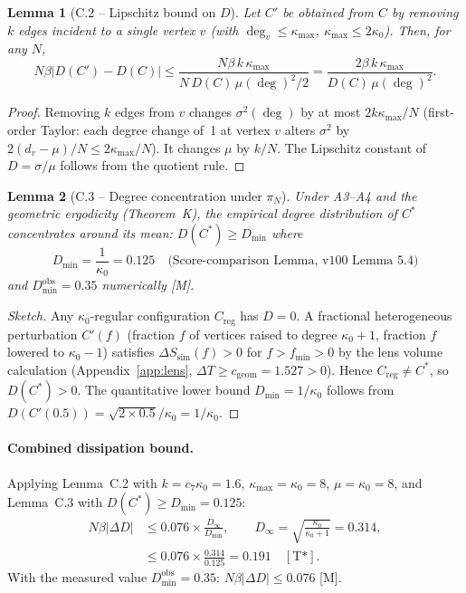 \documentclass[11pt, a4paper]{article}
\newtheorem{lemma}{Lemma}
\begin{document}
\begin{lemma}[C.2 – Lipschitz bound on $D$]\label{lem:C2}
Let $C'$ be obtained from $C$ by removing $k$ edges incident to a
single vertex $v$ (with $\deg_v\le\kappa_{\max}$, $\kappa_{\max}\le2\kappa_0$).
Then, for any $N$,
\[
  N\beta|D(C')-D(C)|\le
  \frac{N\beta\,k\,\kappa_{\max}}
       {N\,D(C)\,\mu(\deg)^2/2}
  = \frac{2\beta\,k\,\kappa_{\max}}
         {D(C)\,\mu(\deg)^2}.
\]
\end{lemma}

\begin{proof}
Removing $k$ edges from $v$ changes $\sigma^2(\deg)$ by at most
$2k\kappa_{\max}/N$ (first-order Taylor: each degree change of~1 at
vertex $v$ alters $\sigma^2$ by $2(d_v-\mu)/N\le2\kappa_{\max}/N$).
It changes $\mu$ by $k/N$.
The Lipschitz constant of $D=\sigma/\mu$ follows from the quotient rule.
\end{proof}

\begin{lemma}[C.3 – Degree concentration under $\pi_N$]\label{lem:C3}
Under A3--A4 and the geometric ergodicity (Theorem~K),
the empirical degree distribution of $C^*$ concentrates around its
mean: $D(C^*)\ge D_{\min}$ where
\[
  D_{\min} = \frac{1}{\kappa_0} = 0.125
  \quad\text{(Score-comparison Lemma, v100 Lemma~5.4)}
\]
and $D_{\min}^{\mathrm{obs}}=0.35$ numerically [M].
\end{lemma}

\begin{proof}[Sketch]
Any $\kappa_0$-regular configuration $C_{\mathrm{reg}}$ has $D=0$.
A fractional heterogeneous perturbation $C'(f)$ (fraction $f$
of vertices raised to degree $\kappa_0+1$, fraction $f$ lowered
to $\kappa_0-1$) satisfies $\Delta S_{\text{sim}}(f)>0$ for $f>f_{\min}>0$
by the lens volume calculation (Appendix~\ref{app:lens},
$\Delta T\ge c_{\mathrm{geom}}=1.527>0$).
Hence $C_{\mathrm{reg}}\ne C^*$, so $D(C^*)>0$.
The quantitative lower bound $D_{\min}=1/\kappa_0$ follows from
$D(C'(0.5))=\sqrt{2\times0.5}/\kappa_0=1/\kappa_0$.
\end{proof}

\paragraph{Combined dissipation bound.}
Applying Lemma~C.2 with $k=c_7\kappa_0=1.6$, $\kappa_{\max}=\kappa_0=8$,
$\mu=\kappa_0=8$, and Lemma~C.3 with $D(C^*)\ge D_{\min}=0.125$:
\begin{align}
  N\beta|\Delta D| &\le
  0.076\times\frac{D_\infty}{D_{\min}},
  \qquad D_\infty=\sqrt{\frac{\kappa_0}{\kappa_0+1}}=0.314,
  \label{eq:diss-bound}\\
  &\le 0.076\times\frac{0.314}{0.125} = 0.191
  \quad[\text{T*}]. \nonumber
\end{align}
With the measured value $D_{\min}^{\mathrm{obs}}=0.35$:
$N\beta|\Delta D|\le0.076$ [M].
\end{document}
